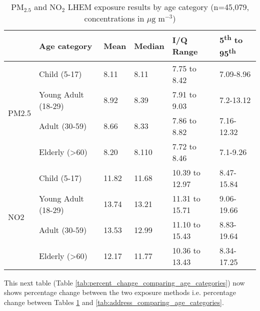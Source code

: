 \begin{table}[H]
\centering
\begin{tabular}{|l|l|l|l|l|l|}
\hline
                       & \bfseries{Age category}  & \bfseries{Mean}  & \bfseries{Median} & \bfseries{I/Q Range} & \bfseries{5\textsuperscript{th} to 95\textsuperscript{th}} \\ \hline
\multirow{4}{*}{PM2.5} & Child (5-17)             & 8.11    & 8.11   & 7.75 to 8.42    & 7.09-8.96 \\ \cline{2-5} 
                       & Young Adult (18-29)      & 8.92    & 8.39   & 7.91 to 9.03    & 7.2-13.12 \\ \cline{2-5} 
                       & Adult (30-59)            & 8.66    & 8.33   & 7.86 to 8.82    & 7.16-12.32 \\ \cline{2-5} 
                       & Elderly (\textgreater60) & 8.20    & 8.110  & 7.72 to 8.46    & 7.1-9.26 \\ \hline
\multirow{4}{*}{NO2}   & Child (5-17)             & 11.82   & 11.68  & 10.39 to 12.97  & 8.47-15.84 \\ \cline{2-5} 
                       & Young Adult (18-29)      & 13.74   & 13.21  & 11.31 to 15.71  & 9.06-19.66 \\ \cline{2-5} 
                       & Adult (30-59)            & 13.53   & 12.99  & 11.10 to 15.43  & 8.83-19.64 \\ \cline{2-5} 
                       & Elderly (\textgreater60) & 12.17   & 11.77  & 10.36 to 13.43  & 8.34-17.25 \\ \hline
\end{tabular}
\caption{PM$_{2.5}$ and NO$_{2}$ LHEM exposure results by age category (n=45,079, concentrations in $\mu \text{g m}^{-3}$)}
\label{tab:lhem_comparing_age_categories}
\end{table}

This next table (Table \ref{tab:percent_change_comparing_age_categories}) now shows percentage change between the two exposure methods i.e. percentage change between Tables \ref{tab:lhem_comparing_age_categories} and \ref{tab:address_comparing_age_categories}.

